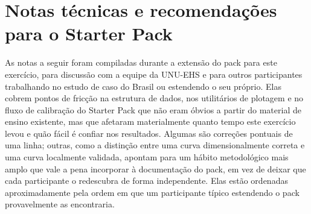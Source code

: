 \documentclass[11pt]{article}
\begin{document}



\appendix

\section{Notas técnicas e recomendações para o Starter Pack}
\label{app:notas}

As notas a seguir foram compiladas durante a extensão do pack para este exercício, para
discussão com a equipe da UNU-EHS e para outros participantes trabalhando no estudo de
caso do Brasil ou estendendo o seu próprio. Elas cobrem pontos de fricção na estrutura de
dados, nos utilitários de plotagem e no fluxo de calibração do Starter Pack que não eram
óbvios a partir do material de ensino existente, mas que afetaram materialmente quanto
tempo este exercício levou e quão fácil é confiar nos resultados. Algumas são correções
pontuais de uma linha; outras, como a distinção entre uma curva dimensionalmente correta e
uma curva localmente validada, apontam para um hábito metodológico mais amplo que vale a
pena incorporar à documentação do pack, em vez de deixar que cada participante o redescubra
de forma independente. Elas estão ordenadas aproximadamente pela ordem em que um
participante típico estendendo o pack provavelmente as encontraria.
\end{document}
